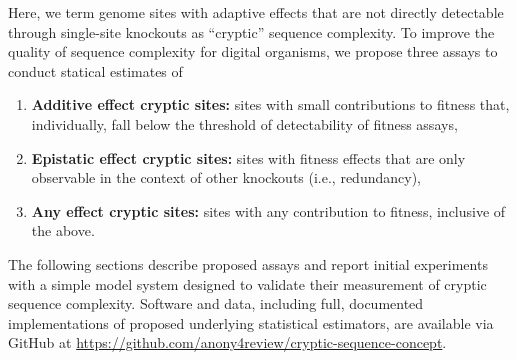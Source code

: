 



Here, we term genome sites with adaptive effects that are not directly detectable through single-site knockouts as ``cryptic'' sequence complexity.
To improve the quality of sequence complexity for digital organisms, we propose three assays to conduct statical estimates of
\begin{enumerate}
\item \textbf{Additive effect cryptic sites:} sites with small contributions to fitness that, individually, fall below the threshold of detectability of fitness assays,
\item \textbf{Epistatic effect cryptic sites:} sites with fitness effects that are only observable in the context of other knockouts (i.e., redundancy),
\item \textbf{Any effect cryptic sites:} sites with any contribution to fitness, inclusive of the above.
\end{enumerate}

The following sections describe proposed assays and report initial experiments with a simple model system designed to validate their measurement of cryptic sequence complexity.
Software and data, including full, documented implementations of proposed underlying statistical estimators, are available via GitHub at \url{https://github.com/anony4review/cryptic-sequence-concept}.
